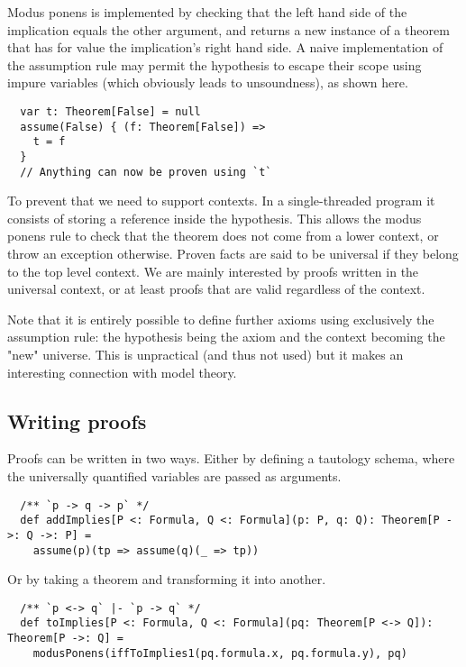 \documentclass[acmlarge]{acmart}
\begin{document}
Modus ponens is implemented by checking that the left hand side of the implication equals the other argument, and returns a new instance of a theorem that has for value the implication's right hand side.
A naive implementation of the assumption rule may permit the hypothesis to escape their scope using impure variables (which obviously leads to unsoundness), as shown here.

\begin{verbatim}
  var t: Theorem[False] = null
  assume(False) { (f: Theorem[False]) =>
    t = f
  }
  // Anything can now be proven using `t`
\end{verbatim}

To prevent that we need to support contexts. In a single-threaded program it consists of storing a reference inside the hypothesis. This allows the modus ponens rule to check that the theorem does not come from a lower context, or throw an exception otherwise. Proven facts are said to be universal if they belong to the top level context. We are mainly interested by proofs written in the universal context, or at least proofs that are valid regardless of the context.

Note that it is entirely possible to define further axioms using exclusively the assumption rule: the hypothesis being the axiom and the context becoming the "new" universe. This is unpractical (and thus not used) but it makes an interesting connection with model theory.

\subsection{Writing proofs}


Proofs can be written in two ways. Either by defining a tautology schema, where the universally quantified variables are passed as arguments.

\begin{verbatim}
  /** `p -> q -> p` */
  def addImplies[P <: Formula, Q <: Formula](p: P, q: Q): Theorem[P ->: Q ->: P] =
    assume(p)(tp => assume(q)(_ => tp))
\end{verbatim}

Or by taking a theorem and transforming it into another.

\begin{verbatim}
  /** `p <-> q` |- `p -> q` */
  def toImplies[P <: Formula, Q <: Formula](pq: Theorem[P <-> Q]): Theorem[P ->: Q] =
    modusPonens(iffToImplies1(pq.formula.x, pq.formula.y), pq)
\end{verbatim}
\end{document}
